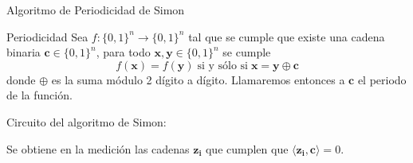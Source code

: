 \documentclass[10pt,compress]{beamer}
\begin{document}
\begin{frame}{Algoritmo de Periodicidad de Simon}
\begin{block}{Periodicidad}
Sea $f:\{0,1\}^n \longrightarrow \{0,1\}^n$ tal que se cumple que existe una cadena binaria $\mathbf{c}\in\{0,1\}^n$, para todo $\mathbf{x}, \mathbf{y}\in\{0,1\}^n$ se cumple
\begin{equation}
f(\mathbf{x}) = f(\mathbf{y}) \; \text{si y sólo si} \; \mathbf{x} = \mathbf{y}\oplus \mathbf{c}
\end{equation}
donde $\oplus$ es la suma módulo 2 dígito a dígito. Llamaremos entonces a $\mathbf{c}$ el periodo de la función.
\end{block}
\pause
Circuito del algoritmo de Simon:
\begin{center}
\end{center}
\pause
Se obtiene en la medición las cadenas $\mathbf{z_i}$ que cumplen que $\langle \mathbf{z_i}, \mathbf{c} \rangle = 0$.

\end{frame}
\end{document}
